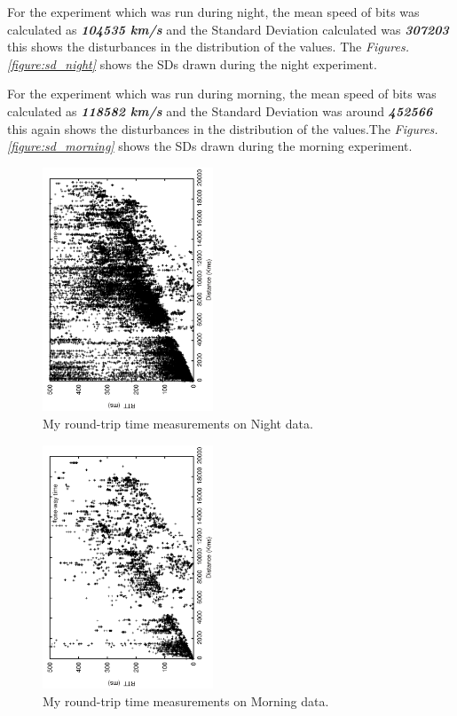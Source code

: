 \documentclass[twocolumn]{article}
\begin{document}
For the experiment which was run during night, the mean speed of bits was calculated as \textit{\textbf{104535 km/s}} and the Standard Deviation calculated was \textit{\textbf{307203}} this shows the disturbances in the distribution of the values. The \textit{Figures. \ref{figure:sd_night}} shows the SDs drawn during the night experiment.

For the experiment which was run during morning, the mean speed of bits was calculated as \textit{\textbf{118582 km/s}}  and the Standard Deviation was around \textit{\textbf{452566}} this again shows the disturbances in the distribution of the values.The \textit{Figures.\ref{figure:sd_morning}} shows the SDs drawn during the morning experiment.


\begin{figure}
\centering
\includegraphics[width=2in,angle=270]{scatterplot_night.pdf}
\caption{My round-trip time measurements on Night data.}
\label{figure:scplt_night}
\end{figure}

\begin{figure}
\centering
\includegraphics[width=2in,angle=270]{scatterplot_morning.pdf}
\caption{My round-trip time measurements on Morning data.}
\label{figure:scplt_morning}
\end{figure}
\end{document}
